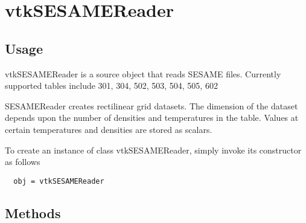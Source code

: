 \section{vtkSESAMEReader}

\subsection{Usage}

 vtkSESAMEReader is a source object that reads SESAME files.
 Currently supported tables include 301, 304, 502, 503, 504, 505, 602

 SESAMEReader creates rectilinear grid datasets. The dimension of the 
 dataset depends upon the number of densities and temperatures in the table.
 Values at certain temperatures and densities are stored as scalars.


To create an instance of class vtkSESAMEReader, simply
invoke its constructor as follows
\begin{verbatim}
  obj = vtkSESAMEReader
\end{verbatim}
\subsection{Methods}

